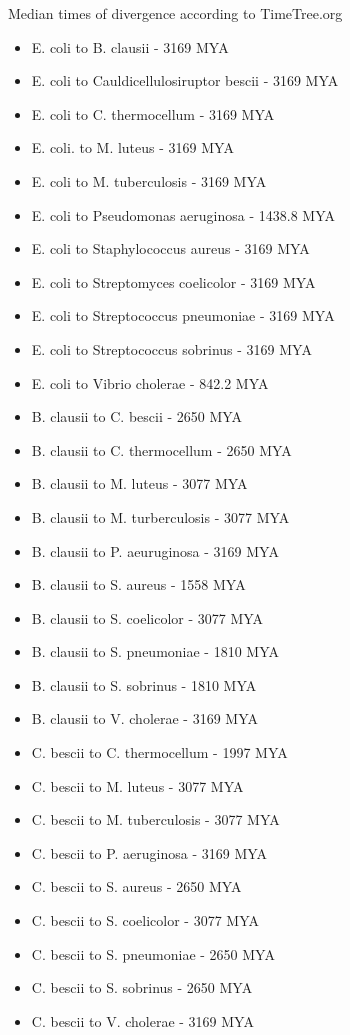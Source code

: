 \documentclass[11pt]{labbook}
\begin{document}
Median times of divergence according to TimeTree.org
\begin{itemize}
\item E. coli to B. clausii - 3169 MYA
\item E. coli to Cauldicellulosiruptor bescii - 3169 MYA
\item E. coli to C. thermocellum - 3169 MYA
\item E. coli. to M. luteus - 3169 MYA
\item E. coli to M. tuberculosis - 3169 MYA
\item E. coli to Pseudomonas aeruginosa - 1438.8 MYA
\item E. coli to Staphylococcus aureus - 3169 MYA
\item E. coli to Streptomyces coelicolor - 3169 MYA
\item E. coli to Streptococcus pneumoniae - 3169 MYA
\item E. coli to Streptococcus sobrinus - 3169 MYA
\item E. coli to Vibrio cholerae - 842.2 MYA
\item B. clausii to C. bescii - 2650 MYA
\item B. clausii to C. thermocellum - 2650 MYA
\item B. clausii to M. luteus - 3077 MYA
\item B. clausii to M. turberculosis - 3077 MYA
\item B. clausii to P. aeuruginosa - 3169 MYA
\item B. clausii to S. aureus - 1558 MYA
\item B. clausii to S. coelicolor - 3077 MYA
\item B. clausii to S. pneumoniae - 1810 MYA
\item B. clausii to S. sobrinus - 1810 MYA
\item B. clausii to V. cholerae - 3169 MYA
\item C. bescii to C. thermocellum - 1997 MYA
\item C. bescii to M. luteus - 3077 MYA
\item C. bescii to M. tuberculosis - 3077 MYA
\item C. bescii to P. aeruginosa - 3169 MYA
\item C. bescii to S. aureus - 2650 MYA
\item C. bescii to S. coelicolor - 3077 MYA
\item C. bescii to S. pneumoniae - 2650 MYA
\item C. bescii to S. sobrinus - 2650 MYA
\item C. bescii to V. cholerae - 3169 MYA

\end{itemize}
\end{document}
